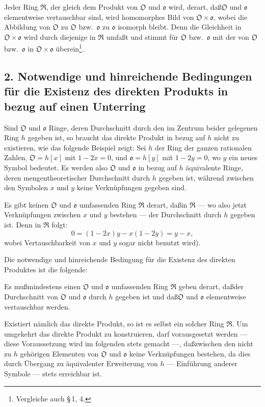 \documentclass[10pt,a4paper]{article}
\theoremstyle{plain}
\theoremstyle{definition}
\theoremstyle{remark}
\newcommand{\ido}{\mathfrak{o}}
\newcommand{\cO}{\mathfrak{O}}
\newcommand{\cR}{\mathfrak{R}}
\begin{document}
Jeder Ring $\cR$, der gleich dem Produkt von $\cO$ und $\ido$ wird, derart, da\ss  $\cO$ und $\ido$ elementweise vertauschbar sind, wird homomorphes Bild von $\cO \times \ido$, wobei die Abbildung von $\cO$ zu $\cO$ bzw.\ $\ido$ zu $\ido$ isomorph bleibt. Denn die Gleichheit in $\cO \times \ido$ wird durch diejenige in $\cR$ umfa\ss t und stimmt f\"ur $\cO$ bzw.\ $\ido$ mit der von $\cO$ bzw.\ $\ido$ in $\cO \times \ido$ \"uberein\footnote{Vergleiche auch \S\,1, 4.}.

\subsection*{2. Notwendige und hinreichende Bedingungen f\"ur die Existenz des direkten Produkts in bezug auf einen Unterring}

Sind $\cO$ und $\ido$ Ringe, deren Durchschnitt durch den im Zentrum beider gelegenen Ring $h$ gegeben ist, so braucht das direkte Produkt in bezug auf $h$ nicht zu existieren, wie das folgende Beispiel zeigt: Sei $h$ der Ring der ganzen rationalen Zahlen, $\cO = h[x]$ mit $1 - 2x = 0$, und $\ido = h[y]$ mit $1 - 2y = 0$, wo $y$ ein neues Symbol bedeutet. Es werden also $\cO$ und $\ido$ in bezug auf $h$ \"aquivalente Ringe, deren mengentheoretischer Durchschnitt durch $h$ gegeben ist, w\"ahrend zwischen den Symbolen $x$ und $y$ keine Verkn\"upfungen gegeben sind.

Es gibt keinen $\cO$ und $\ido$ umfassenden Ring $\cR$ derart, da\ss  in $\cR$ --- wo also jetzt Verkn\"upfungen zwischen $x$ und $y$ bestehen --- der Durchschnitt durch $h$ gegeben ist. Denn in $\cR$ folgt:
\[
0 = (1-2x)y - x(1-2y) = y - x,
\]
wobei Vertauschbarkeit von $x$ und $y$ sogar nicht benutzt wird).

Die notwendige und hinreichende Bedingung f\"ur die Existenz des direkten Produktes ist die folgende:

Es mu\ss  mindestens einen $\cO$ und $\ido$ umfassenden Ring $\cR$ geben derart, da\ss  der Durchschnitt von $\cO$ und $\ido$ durch $h$ gegeben ist und da\ss  $\cO$ und $\ido$ elementweise vertauschbar werden.

Existiert n\"amlich das direkte Produkt, so ist es selbst ein solcher Ring $\cR$. Um umgekehrt das direkte Produkt zu konstruieren, darf vorausgesetzt werden --- diese Voraussetzung wird im folgenden stets gemacht ---, da\ss  zwischen den nicht zu $h$ geh\"origen Elementen von $\cO$ und $\ido$ keine Verkn\"upfungen bestehen, da dies durch \"Ubergang zu \"aquivalenter Erweiterung von $h$ --- Einf\"uhrung anderer Symbole --- stets erreichbar ist.
\end{document}
